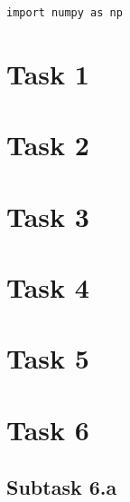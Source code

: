 \documentclass[a4paper,10pt]{article}
\begin{document}
\begin{lstlisting}
import numpy as np

\end{lstlisting}



\clearpage\newpage
\section*{Task 1}





\clearpage\newpage
\section*{Task 2}






\clearpage\newpage
\section*{Task 3}




\clearpage\newpage
\section*{Task 4}





\clearpage\newpage
\section*{Task 5}




\clearpage\newpage
\section*{Task 6}

\subsection*{Subtask 6.a}
\end{document}
